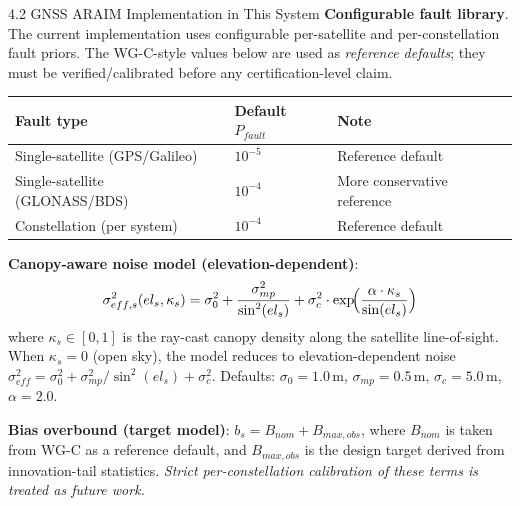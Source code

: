 \documentclass[10pt,aspectratio=169,xcolor=dvipsnames]{beamer}
\newcommand{\1}{\mathbb{1}}
\begin{document}
\begin{frame}{4.2 GNSS ARAIM Implementation in This System}
  \small
  \textbf{Configurable fault library}. The current implementation uses configurable per-satellite and per-constellation fault priors. The WG-C-style values below are used as \emph{reference defaults}; they must be verified/calibrated before any certification-level claim.

  \begin{table}\scriptsize
    \begin{tabular}{lll}
      \toprule
      Fault type & Default $P_{fault}$ & Note\\
      \midrule
      Single-satellite (GPS/Galileo) & $10^{-5}$ & Reference default\\
      Single-satellite (GLONASS/BDS) & $10^{-4}$ & More conservative reference\\
      Constellation (per system) & $10^{-4}$ & Reference default\\
      \bottomrule
    \end{tabular}
  \end{table}

  \textbf{Canopy-aware noise model (elevation-dependent)}:
  \[
    \sigma_{eff,s}^2(el_s,\kappa_s) = \sigma_0^2 + \frac{\sigma_{mp}^2}{\sin^2(el_s)} + \sigma_c^2 \cdot \exp\!\Bigl(\frac{\alpha\cdot\kappa_s}{\sin(el_s)}\Bigr)
  \]
  where $\kappa_s\in[0,1]$ is the ray-cast canopy density along the satellite line-of-sight.
  When $\kappa_s=0$ (open sky), the model reduces to elevation-dependent noise
  $\sigma_{eff}^2 = \sigma_0^2 + \sigma_{mp}^2/\sin^2(el_s) + \sigma_c^2$.
  Defaults: $\sigma_0=1.0\,\si{\meter}$, $\sigma_{mp}=0.5\,\si{\meter}$,
  $\sigma_c=5.0\,\si{\meter}$, $\alpha=2.0$.

  \medskip
  \textbf{Bias overbound (target model)}: $b_s = B_{nom} + B_{max,obs}$,
  where $B_{nom}$ is taken from WG-C as a reference default, and $B_{max,obs}$ is the design target derived from innovation-tail statistics. \emph{Strict per-constellation calibration of these terms is treated as future work.}
\end{frame}
\end{document}
